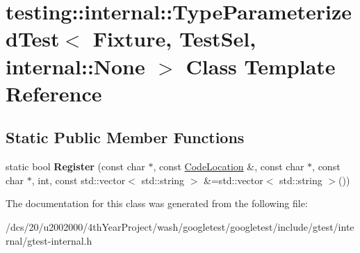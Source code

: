 \hypertarget{classtesting_1_1internal_1_1TypeParameterizedTest_3_01Fixture_00_01TestSel_00_01internal_1_1None_01_4}{}\section{testing\+:\+:internal\+:\+:Type\+Parameterized\+Test$<$ Fixture, Test\+Sel, internal\+:\+:None $>$ Class Template Reference}
\label{classtesting_1_1internal_1_1TypeParameterizedTest_3_01Fixture_00_01TestSel_00_01internal_1_1None_01_4}
\subsection*{Static Public Member Functions}
\begin{DoxyCompactItemize}
\item 
\mbox{\label{classtesting_1_1internal_1_1TypeParameterizedTest_3_01Fixture_00_01TestSel_00_01internal_1_1None_01_4_aa84ae5ee00bd9822810be548d266cce3}} 
static bool {\bfseries Register} (const char $\ast$, const \mbox{\hyperlink{structtesting_1_1internal_1_1CodeLocation}{Code\+Location}} \&, const char $\ast$, const char $\ast$, int, const std\+::vector$<$ std\+::string $>$ \&=std\+::vector$<$ std\+::string $>$())
\end{DoxyCompactItemize}


The documentation for this class was generated from the following file\+:\begin{DoxyCompactItemize}
\item 
/dcs/20/u2002000/4th\+Year\+Project/wash/googletest/googletest/include/gtest/internal/gtest-\/internal.\+h\end{DoxyCompactItemize}
